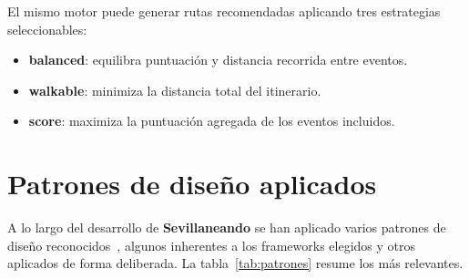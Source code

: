 El mismo motor puede generar rutas recomendadas aplicando tres estrategias seleccionables:

\begin{itemize}
    \item \textbf{balanced}: equilibra puntuación y distancia recorrida entre eventos.
    \item \textbf{walkable}: minimiza la distancia total del itinerario.
    \item \textbf{score}: maximiza la puntuación agregada de los eventos incluidos.
\end{itemize}

\section{Patrones de diseño aplicados}

A lo largo del desarrollo de \textbf{Sevillaneando} se han aplicado varios patrones de diseño reconocidos~\cite{gamma1994design}, algunos inherentes a los frameworks elegidos y otros aplicados de forma deliberada. La tabla~\ref{tab:patrones} resume los más relevantes.

